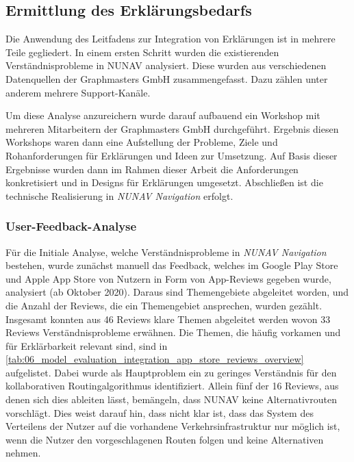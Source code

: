 \subsection{Ermittlung des Erklärungsbedarfs}

Die Anwendung des Leitfadens zur Integration von Erklärungen ist in mehrere Teile gegliedert. In einem ersten Schritt wurden die existierenden Verständnisprobleme in NUNAV analysiert. Diese wurden aus verschiedenen Datenquellen der Graphmasters GmbH zusammengefasst. Dazu zählen unter anderem mehrere Support-Kanäle.

Um diese Analyse anzureichern wurde darauf aufbauend ein Workshop mit mehreren Mitarbeitern der Graphmasters GmbH durchgeführt. Ergebnis diesen Workshops waren dann eine Aufstellung der Probleme, Ziele und Rohanforderungen für Erklärungen und Ideen zur Umsetzung. Auf Basis dieser Ergebnisse wurden dann im Rahmen dieser Arbeit die Anforderungen konkretisiert und in Designs für Erklärungen umgesetzt. Abschließen ist die technische Realisierung in \textit{NUNAV Navigation} erfolgt.

\subsubsection{User-Feedback-Analyse}

Für die Initiale Analyse, welche Verständnisprobleme in \textit{NUNAV Navigation} bestehen, wurde zunächst manuell das Feedback, welches im Google Play Store und Apple App Store von Nutzern in Form von App-Reviews gegeben wurde, analysiert (ab Oktober 2020). Daraus sind Themengebiete abgeleitet worden, und die Anzahl der Reviews, die ein Themengebiet ansprechen, wurden gezählt. Insgesamt konnten aus 46 Reviews klare Themen abgeleitet werden wovon 33 Reviews Verständnisprobleme erwähnen. Die Themen, die häufig vorkamen und für Erklärbarkeit relevant sind, sind in \autoref{tab:06_model_evaluation_integration_app_store_reviews_overview} aufgelistet. Dabei wurde als Hauptproblem ein zu geringes Verständnis für den kollaborativen Routingalgorithmus identifiziert. Allein fünf der 16 Reviews, aus denen sich dies ableiten lässt, bemängeln, dass NUNAV keine Alternativrouten vorschlägt. Dies weist darauf hin, dass nicht klar ist, dass das System des Verteilens der Nutzer auf die vorhandene Verkehrsinfrastruktur nur möglich ist, wenn die Nutzer den vorgeschlagenen Routen folgen und keine Alternativen nehmen.

